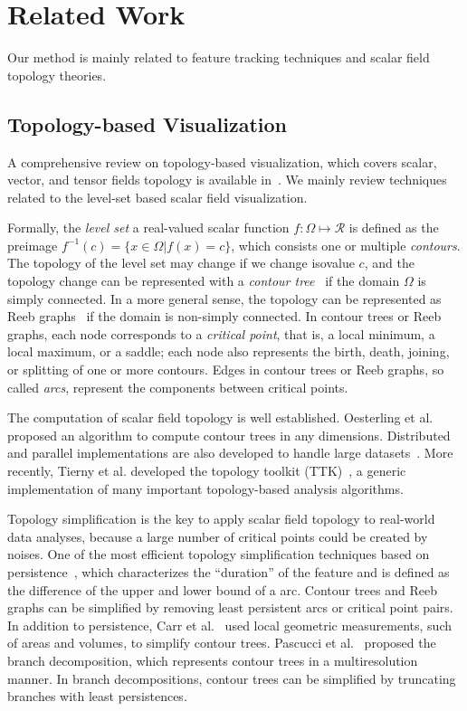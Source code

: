 \section{Related Work}
\label{sec:related}

Our method is mainly related to feature tracking techniques and scalar field topology theories.  


\subsection{Topology-based Visualization}

A comprehensive review on topology-based visualization, which covers scalar, vector, and tensor fields topology is available in~\cite{HeineLHIFSHG16}.  We mainly review techniques related to the level-set based scalar field visualization.  

Formally, the \emph{level set} a real-valued scalar function $f: \Omega\mapsto\mathcal{R}$ is defined as the preimage $f^{-1}(c) = \{x\in\Omega | f(x) = c \}$, which consists one or multiple \emph{contours}.  The topology of the level set may change if we change isovalue $c$, and the topology change can be represented with a \emph{contour tree}~\cite{} if the domain $\Omega$ is simply connected.  In a more general sense, the topology can be represented as Reeb graphs~\cite{Reeb46} if the domain is non-simply connected.  In contour trees or Reeb graphs, each node corresponds to a \emph{critical point}, that is, a local minimum, a local maximum, or a saddle; each node also represents the birth, death, joining, or splitting of one or more contours.  Edges in contour trees or Reeb graphs, so called \emph{arcs}, represent the components between critical points. 

The computation of scalar field topology is well established.  Oesterling et al.~\cite{OesterlingHWMS17} proposed an algorithm to compute contour trees in any dimensions.  Distributed and parallel implementations are also developed to handle large datasets~\cite{MorozovW13}.  More recently, Tierny et al. developed the topology toolkit (TTK)~\cite{TiernyFLGM18}, a generic implementation of many important topology-based analysis algorithms.  

Topology simplification is the key to apply scalar field topology to real-world data analyses, because a large number of critical points could be created by noises.  One of the most efficient topology simplification techniques based on persistence~\cite{EdelsbrunnerLZ02}, which characterizes the ``duration'' of the feature and is defined as the difference of the upper and lower bound of a arc.  Contour trees and Reeb graphs can be simplified by removing least persistent arcs or critical point pairs.  
In addition to persistence, Carr et al.~\cite{CarrSP04} used local geometric measurements, such of areas and volumes, to simplify contour trees.  Pascucci et al.~\cite{Pascucci2004} proposed the branch decomposition, which represents contour trees in a multiresolution manner.  In branch decompositions, contour trees can be simplified by truncating branches with least persistences.  

